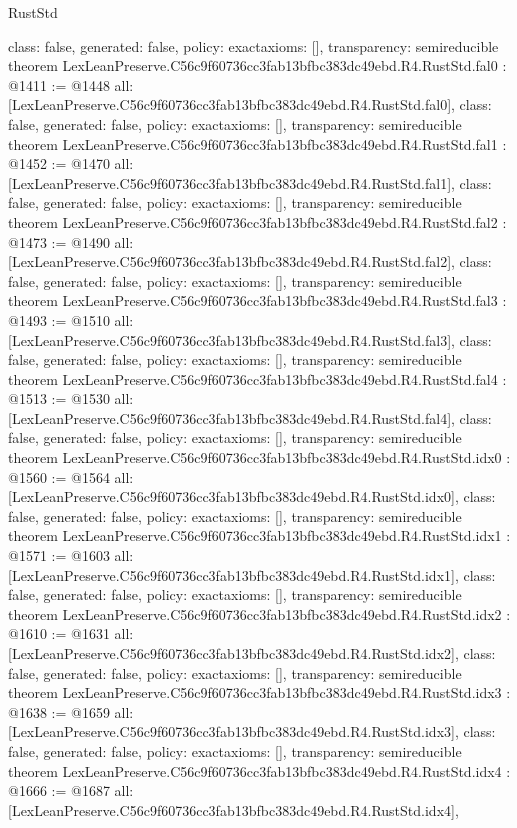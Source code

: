 \begin{lexlean}{RustStd}
\begin{coremodule}
{  class: false,
  generated: false,
  policy: exact{axioms: []},
  transparency: semireducible
}
theorem LexLeanPreserve.C56c9f60736cc3fab13bfbc383dc49ebd.R4.RustStd.fal0 : @1411 := @1448 {
  all: [LexLeanPreserve.C56c9f60736cc3fab13bfbc383dc49ebd.R4.RustStd.fal0],
  class: false,
  generated: false,
  policy: exact{axioms: []},
  transparency: semireducible
}
theorem LexLeanPreserve.C56c9f60736cc3fab13bfbc383dc49ebd.R4.RustStd.fal1 : @1452 := @1470 {
  all: [LexLeanPreserve.C56c9f60736cc3fab13bfbc383dc49ebd.R4.RustStd.fal1],
  class: false,
  generated: false,
  policy: exact{axioms: []},
  transparency: semireducible
}
theorem LexLeanPreserve.C56c9f60736cc3fab13bfbc383dc49ebd.R4.RustStd.fal2 : @1473 := @1490 {
  all: [LexLeanPreserve.C56c9f60736cc3fab13bfbc383dc49ebd.R4.RustStd.fal2],
  class: false,
  generated: false,
  policy: exact{axioms: []},
  transparency: semireducible
}
theorem LexLeanPreserve.C56c9f60736cc3fab13bfbc383dc49ebd.R4.RustStd.fal3 : @1493 := @1510 {
  all: [LexLeanPreserve.C56c9f60736cc3fab13bfbc383dc49ebd.R4.RustStd.fal3],
  class: false,
  generated: false,
  policy: exact{axioms: []},
  transparency: semireducible
}
theorem LexLeanPreserve.C56c9f60736cc3fab13bfbc383dc49ebd.R4.RustStd.fal4 : @1513 := @1530 {
  all: [LexLeanPreserve.C56c9f60736cc3fab13bfbc383dc49ebd.R4.RustStd.fal4],
  class: false,
  generated: false,
  policy: exact{axioms: []},
  transparency: semireducible
}
theorem LexLeanPreserve.C56c9f60736cc3fab13bfbc383dc49ebd.R4.RustStd.idx0 : @1560 := @1564 {
  all: [LexLeanPreserve.C56c9f60736cc3fab13bfbc383dc49ebd.R4.RustStd.idx0],
  class: false,
  generated: false,
  policy: exact{axioms: []},
  transparency: semireducible
}
theorem LexLeanPreserve.C56c9f60736cc3fab13bfbc383dc49ebd.R4.RustStd.idx1 : @1571 := @1603 {
  all: [LexLeanPreserve.C56c9f60736cc3fab13bfbc383dc49ebd.R4.RustStd.idx1],
  class: false,
  generated: false,
  policy: exact{axioms: []},
  transparency: semireducible
}
theorem LexLeanPreserve.C56c9f60736cc3fab13bfbc383dc49ebd.R4.RustStd.idx2 : @1610 := @1631 {
  all: [LexLeanPreserve.C56c9f60736cc3fab13bfbc383dc49ebd.R4.RustStd.idx2],
  class: false,
  generated: false,
  policy: exact{axioms: []},
  transparency: semireducible
}
theorem LexLeanPreserve.C56c9f60736cc3fab13bfbc383dc49ebd.R4.RustStd.idx3 : @1638 := @1659 {
  all: [LexLeanPreserve.C56c9f60736cc3fab13bfbc383dc49ebd.R4.RustStd.idx3],
  class: false,
  generated: false,
  policy: exact{axioms: []},
  transparency: semireducible
}
theorem LexLeanPreserve.C56c9f60736cc3fab13bfbc383dc49ebd.R4.RustStd.idx4 : @1666 := @1687 {
  all: [LexLeanPreserve.C56c9f60736cc3fab13bfbc383dc49ebd.R4.RustStd.idx4],
}
\end{coremodule}
\end{lexlean}
